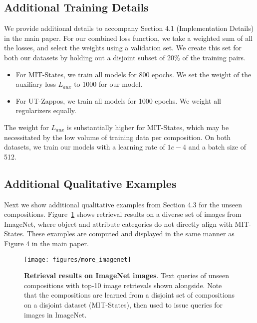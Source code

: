 \documentclass[runningheads]{llncs}
\newcommand{\reffig}[1]{Figure~\ref{#1}}
\begin{document}
\subsection*{Additional Training Details}

We provide additional details to accompany Section 4.1 (Implementation Details) in the main paper. 
For our combined loss function, we take a weighted sum of all the losses, and select the weights using a validation set. We create this set for both our datasets by holding out a disjoint subset of 20\% of the training pairs. 

\begin{itemize}
	\item For MIT-States, we train all models for 800 epochs. We set the weight of the auxiliary loss $L_{aux}$ to 1000 for our model.
	\item For UT-Zappos, we train all models for 1000 epochs. We weight all regularizers equally. 
\end{itemize}

The weight for $L_{aux}$ is substantially higher for MIT-States, which may be necessitated by the low volume of training data per composition. On both datasets, we train our models with a learning rate of $1e-4$ and a batch size of 512.

\subsection*{Additional Qualitative Examples}
Next we show additional qualitative examples from Section 4.3 for the unseen compositions.  \reffig{fig:more_imagenet} shows retrieval results on a diverse set of images from ImageNet, where object and attribute categories do not directly align with MIT-States.  These examples are computed and displayed in the same manner as Figure 4 in the main paper.

\begin{figure}[t]
\centering
\texttt{[image: figures/more\_imagenet]}
\caption{\textbf{Retrieval results on ImageNet images}. Text queries of unseen compositions with top-10 image retrievals shown alongside. Note that the compositions are learned from a disjoint set of compositions on a disjoint dataset (MIT-States), then used to issue queries for images in ImageNet.} 
\label{fig:more_imagenet}
\end{figure} 
\end{document}
